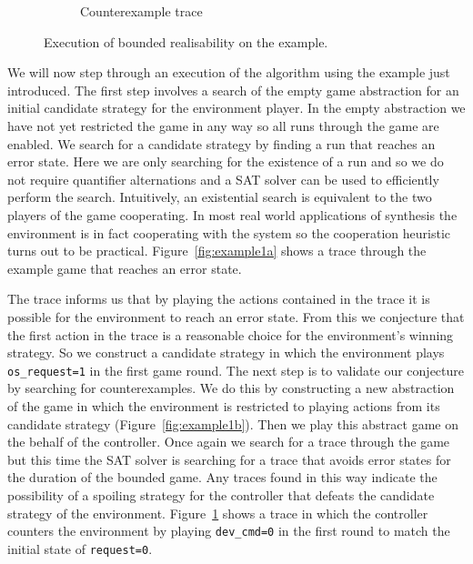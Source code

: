 \begin{figure}
\begin{subfigure}[t]{0.3\textwidth}
\begin{minipage}[t][3.9cm][t]{\textwidth}
        \end{minipage}
        \caption{Counterexample trace}
        \label{fig:example1c}
    \end{subfigure}
    \caption{Execution of bounded realisability on the example.}
    \label{fig:example1exe}
\end{figure}

We will now step through an execution of the algorithm using the example just introduced. The first step involves a search of the empty game abstraction for an initial candidate strategy for the environment player. In the empty abstraction we have not yet restricted the game in any way so all runs through the game are enabled. We search for a candidate strategy by finding a run that reaches an error state. Here we are only searching for the existence of a run and so we do not require quantifier alternations and a SAT solver can be used to efficiently perform the search. Intuitively, an existential search is equivalent to the two players of the game cooperating. In most real world applications of synthesis the environment is in fact cooperating with the system so the cooperation heuristic turns out to be practical. Figure~\ref{fig:example1a} shows a trace through the example game that reaches an error state.

The trace informs us that by playing the actions contained in the trace it is possible for the environment to reach an error state. From this we conjecture that the first action in the trace is a reasonable choice for the environment's winning strategy. So we construct a candidate strategy in which the environment plays \texttt{os\_request=1} in the first game round. The next step is to validate our conjecture by searching for counterexamples. We do this by constructing a new abstraction of the game in which the environment is restricted to playing actions from its candidate strategy (Figure~\ref{fig:example1b}). Then we play this abstract game on the behalf of the controller. Once again we search for a trace through the game but this time the SAT solver is searching for a trace that avoids error states for the duration of the bounded game. Any traces found in this way indicate the possibility of a spoiling strategy for the controller that defeats the candidate strategy of the environment. Figure~\ref{fig:example1c} shows a trace in which the controller counters the environment by playing \texttt{dev\_cmd=0} in the first round to match the initial state of \texttt{request=0}.

